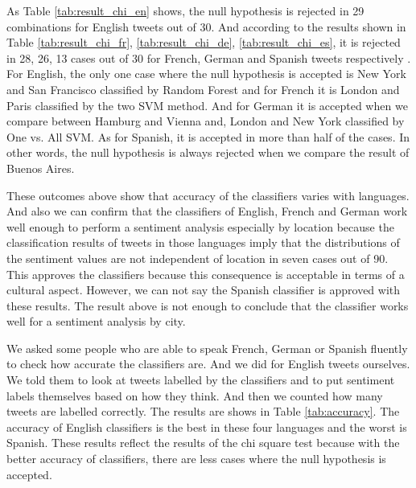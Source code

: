 As Table \ref{tab:result_chi_en} shows, the null hypothesis is rejected in 29 combinations for English tweets out of 30.
And according to the results shown in Table \ref{tab:result_chi_fr}, \ref{tab:result_chi_de}, \ref{tab:result_chi_es}, it is rejected in 28, 26, 13 cases out of 30 for French, German and Spanish tweets respectively . 
For English, the only one case where the null hypothesis is accepted is New York and San Francisco classified by Random Forest and for French it is London and Paris classified by the two SVM method.
And for German it is accepted when we compare between Hamburg and Vienna and, London and New York classified by One vs. All SVM.
As for Spanish, it is accepted in more than half of the cases.
In other words, the null hypothesis is always rejected when we compare the result of Buenos Aires.

These outcomes above show that accuracy of the classifiers varies with languages. 
And also we can confirm that the classifiers of English, French and German work well enough to perform a sentiment analysis especially by location because the classification results of tweets in those languages imply that the distributions of the sentiment values are not independent of location in seven cases out of 90.
This approves the classifiers because this consequence is acceptable in terms of a cultural aspect.
However, we can not say the Spanish classifier is approved with these results.
The result above is not enough to conclude that the classifier works well for a sentiment analysis by city.

We asked some people who are able to speak French, German or Spanish fluently to check how accurate the classifiers are.
And we did for English tweets ourselves.
We told them to look at tweets labelled by the classifiers and to put sentiment labels themselves based on how they think. 
And then we counted how many tweets are labelled correctly.
The results are shows in Table \ref{tab:accuracy}. 
The accuracy of English classifiers is the best in these four languages and the worst is Spanish.
These results reflect the results of the chi square test because with the better accuracy of classifiers, there are less cases where the null hypothesis is accepted.

